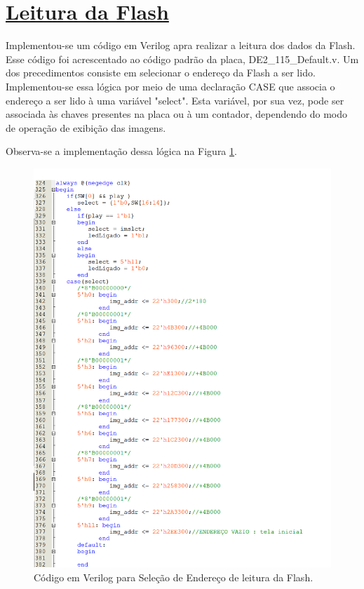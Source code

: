\documentclass[14pt, oneside]{book}
\newcommand\tab[1][1cm]{\hspace*{#1}}
\theoremstyle{definition}
\begin{document}
            \section[Leitura da Flash]{\hyperlink{toc}{Leitura da Flash}}
                
                \tab Implementou-se um código em Verilog apra realizar a leitura dos dados da Flash. Esse código foi acrescentado ao código padrão da placa, DE2\_115\_Default.v. Um dos precedimentos consiste em selecionar o endereço da Flash a ser lido. Implementou-se essa lógica por meio de uma declaração CASE que associa o endereço a ser lido à uma variável "select". Esta variável, por sua vez, pode ser associada às chaves presentes na placa ou à um contador, dependendo do modo de operação de exibição das imagens.
                
                \tab Observa-se a implementação dessa lógica na Figura \ref{leitura endereço}.
                    
                    \begin{figure}[H]
                    \centering
                    \includegraphics[scale=0.7]{leitura_endereco.png}
                    \caption{Código em Verilog para Seleção de Endereço de leitura da Flash.}
                    \label{leitura endereço}
                \end{figure}
                
\end{document}
